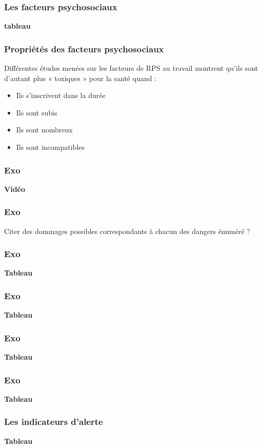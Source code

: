 \documentclass{beamer}
\begin{document}
\begin{frame}
\frametitle{Les facteurs psychosociaux}
\textbf{tableau}
\end{frame}

\begin{frame}
\frametitle{Propriétés des facteurs psychosociaux}
Différentes études menées sur les facteurs de RPS au travail montrent qu’ils sont d’autant plus « toxiques » pour la santé quand :
\begin{itemize}
\item Ils s’inscrivent dans la durée
\item Ils sont subis
\item Ils sont nombreux
\item Ils sont incompatibles
\end{itemize}
\end{frame}

\begin{frame}
\frametitle{Exo}
\textbf{Vidéo}
\end{frame}

\begin{frame}
\frametitle{Exo}
Citer des dommages possibles correspondants à chacun des dangers énuméré ? 
\end{frame}

\begin{frame}
\frametitle{Exo}
\textbf{Tableau}
\end{frame}

\begin{frame}
\frametitle{Exo}
\textbf{Tableau}
\end{frame}

\begin{frame}
\frametitle{Exo}
\textbf{Tableau}
\end{frame}

\begin{frame}
\frametitle{Exo}
\textbf{Tableau}
\end{frame}

\begin{frame}
\frametitle{Les indicateurs d’alerte}
\textbf{Tableau}
\end{frame}
\end{document}
